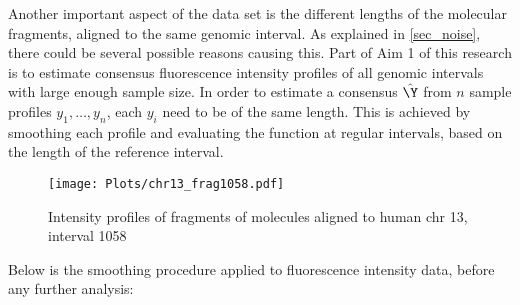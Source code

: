 Another important aspect of the data set is the different lengths of the molecular fragments, aligned to the same genomic interval. As explained in \ref{sec_noise}, there could be several possible reasons causing this. Part of Aim 1 of this research is to estimate consensus fluorescence intensity profiles of all genomic intervals with large enough sample size. In order to estimate a consensus $\hat{\Y}$ from $n$ sample profiles $y_1, \dots, y_n$, each $y_i$ need to be of the same length. This is achieved by smoothing each profile and evaluating the function at regular intervals, based on the length of the reference interval. 

\begin{figure}[H]
\begin{center}
\texttt{[image: Plots/chr13\_frag1058.pdf]}
\end{center}
\caption{Intensity profiles of fragments of molecules aligned to human chr 13, interval 1058}
\label{fig:Fig3_frag1058_orig}
\end{figure}
Below is the smoothing procedure applied to fluorescence intensity data, before any further analysis:
